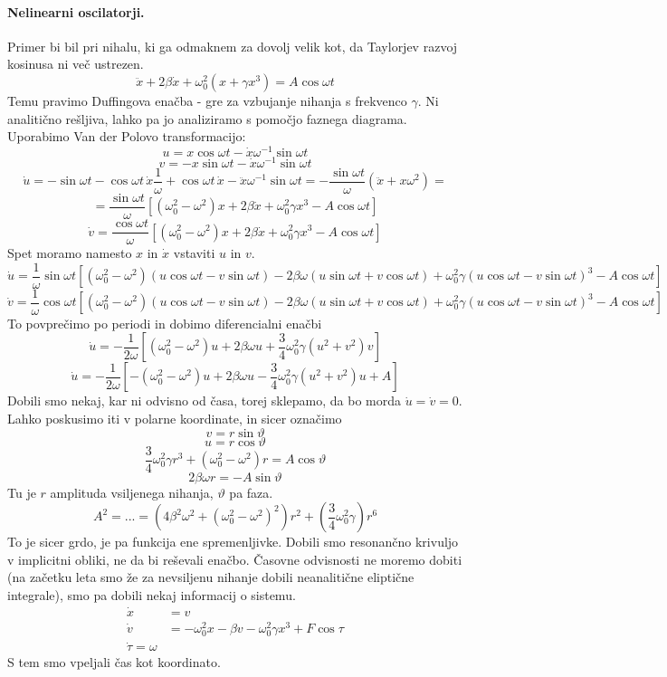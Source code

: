 \documentclass[a4paper]{article}
\begin{document}
\paragraph{Nelinearni oscilatorji.} Primer bi bil pri nihalu, ki ga odmaknem za dovolj velik kot, da Taylorjev razvoj kosinusa ni več ustrezen.
$$\ddot{x} + 2\beta\dot{x} + \omega_0^2(x + \gamma x^3) = A\cos\omega t$$
Temu pravimo Duffingova enačba - gre za vzbujanje nihanja s frekvenco $\gamma$. Ni analitično rešljiva, lahko pa jo analiziramo s pomočjo faznega diagrama. Uporabimo Van der Polovo transformacijo:
$$u = x\cos\omega t - \dot x \omega^{-1}\sin\omega t$$
$$v = -x\sin \omega t - \dot x \omega^{-1}\sin\omega t$$
$$\dot u = -\sin\omega t - \cos\omega t\,\dot x \frac{1}{\omega} + \cos\omega t\,\dot x - \ddot x \omega^{-1}\sin\omega t = -\frac{\sin \omega t}{\omega} (\ddot x + x \omega^2) = $$
$$ = \frac{\sin\omega t}{\omega} \left[(\omega_0^2 - \omega^2)x + 2\beta \dot x + \omega_0^2\gamma x^3 - A\cos\omega t\right]$$
$$\dot v = \frac{\cos\omega t}{\omega} \left[(\omega_0^2 - \omega^2)x + 2\beta \dot x + \omega_0^2\gamma x^3 - A\cos\omega t\right]$$
Spet moramo namesto $x$ in $\dot x$ vstaviti $u$ in $v$.
$$\dot u = \frac{1}{\omega}\sin\omega t \left[(\omega_0^2 - \omega^2)(u\cos\omega t - v\sin\omega t) - 2\beta\omega(u\sin\omega t + v\cos\omega t) + \omega_0^2\gamma(u\cos\omega t - v\sin\omega t)^3 - A\cos\omega t\right]$$
$$\dot v = \frac{1}{\omega}\cos\omega t \left[(\omega_0^2 - \omega^2)(u\cos\omega t - v\sin\omega t) - 2\beta\omega(u\sin\omega t + v\cos\omega t) + \omega_0^2\gamma(u\cos\omega t - v\sin\omega t)^3 - A\cos\omega t\right]$$
To povprečimo po periodi in dobimo diferencialni enačbi
$$\dot u = -\frac{1}{2\omega} \left[(\omega_0^2-\omega^2)u + 2\beta\omega u + \frac{3}{4}\omega_0^2\gamma(u^2 + v^2)v\right]$$
$$\dot u = -\frac{1}{2\omega} \left[-(\omega_0^2-\omega^2)u + 2\beta\omega u - \frac{3}{4}\omega_0^2\gamma(u^2 + v^2)u + A\right]$$
Dobili smo nekaj, kar ni odvisno od časa, torej sklepamo, da bo morda $\dot u = \dot v = 0$. Lahko poskusimo iti v polarne koordinate, in sicer označimo
$$v = r\sin\vartheta$$
$$u = r\cos\vartheta$$
$$\frac{3}{4}\omega_0^2\gamma r^3 + (\omega_0^2 - \omega^2)r = A\cos\vartheta$$
$$2\beta\omega r = -A\sin\vartheta$$
Tu je $r$ amplituda vsiljenega nihanja, $\vartheta$ pa faza.
$$A^2 = ... = (4\beta^2\omega^2 + (\omega_0^2 - \omega^2)^2)r^2 + \left(\frac{3}{4}\omega_0^2\gamma\right)r^6$$
To je sicer grdo, je pa funkcija ene spremenljivke. Dobili smo resonančno krivuljo v implicitni obliki, ne da bi reševali enačbo.
Časovne odvisnosti ne moremo dobiti (na začetku leta smo že za nevsiljenu nihanje dobili neanalitične eliptične integrale), smo pa dobili nekaj informacij o sistemu.
\begin{align*}
    \dot x & = v \\
    \dot v & = -\omega_0^2 x - \beta v - \omega_0^2\gamma x^3 + F\cos\tau \\
    \dot \tau = \omega
\end{align*}
S tem smo vpeljali čas kot koordinato.
\end{document}
